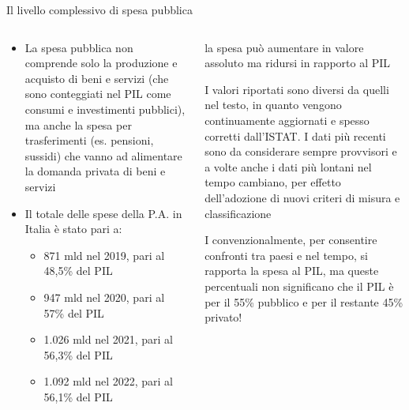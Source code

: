 \documentclass[aspectratio=149,11pt,italian]{beamer}
\begin{document}
\begin{frame}{Il livello complessivo di spesa pubblica}
\begin{columns}
\begin{column}{.6\columnwidth}
\begin{itemize}
\item La spesa pubblica non comprende solo la produzione e acquisto di beni e
servizi (che sono conteggiati nel PIL come consumi e investimenti pubblici),
ma anche la spesa per trasferimenti (es. pensioni, sussidi) che vanno ad
alimentare la domanda privata di beni e servizi

\item Il totale delle spese della P.A. in Italia è stato pari a:
\begin{itemize}
\item 871 mld nel 2019, pari al 48,5\% del PIL
\item 947 mld nel 2020, pari al 57\% del PIL
\item 1.026 mld nel 2021, pari al 56,3\% del PIL
\item 1.092 mld nel 2022, pari al 56,1\% del PIL
\end{itemize}
\end{itemize}
\end{column}

\begin{column}{.4\columnwidth}
\begin{block}{}
\scriptsize
la spesa può aumentare in valore assoluto ma ridursi in rapporto al PIL
\end{block}

\begin{block}{}
\scriptsize
I valori riportati sono diversi da quelli nel testo, in quanto vengono continuamente aggiornati e spesso corretti dall’ISTAT. 
I dati più recenti sono da considerare sempre provvisori e a volte anche i dati più lontani  nel tempo cambiano, per effetto dell’adozione di nuovi criteri di misura e classificazione
\end{block}

\begin{block}{}
\scriptsize
I convenzionalmente, per consentire confronti tra paesi e nel tempo, si rapporta la spesa al PIL, ma queste percentuali \alert{non significano} che il PIL è per il 55\% pubblico e per il restante 45\% privato!
\end{block}
\end{column}
\end{columns}
\end{frame}
\end{document}
